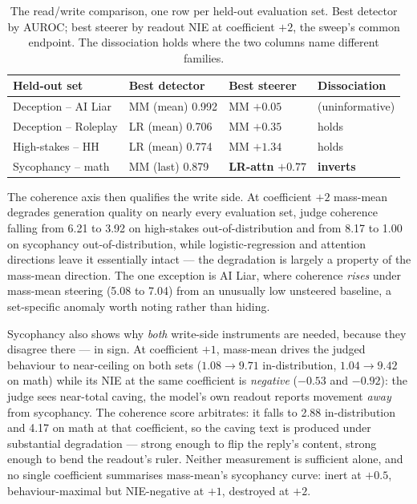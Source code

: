 \documentclass[conference]{IEEEtran}
\begin{document}
\begin{table}[t]
\caption{The read/write comparison, one row per held-out evaluation set. Best
detector by AUROC; best steerer by readout NIE at coefficient $+2$, the sweep's
common endpoint. The dissociation holds where the two columns name different
families.}
\label{tab:synth}
\centering
\footnotesize
\setlength{\tabcolsep}{2pt}
\begin{tabular}{llll}
\toprule
\textbf{Held-out set} & \textbf{Best detector} & \textbf{Best steerer} & \textbf{Dissociation} \\
\midrule
Deception -- AI Liar & MM (mean) 0.992 & MM $+0.05$ & (uninformative) \\
Deception -- Roleplay & LR (mean) 0.706 & MM $+0.35$ & holds \\
High-stakes -- HH & LR (mean) 0.774 & MM $+1.34$ & holds \\
Sycophancy -- math & MM (last) 0.879 & \textbf{LR-attn} $+0.77$ & \textbf{inverts} \\
\bottomrule
\end{tabular}
\end{table}

The coherence axis then qualifies the write side. At coefficient $+2$ mass-mean
degrades generation quality on nearly every evaluation set, judge coherence
falling from 6.21 to 3.92 on high-stakes out-of-distribution and from 8.17 to
1.00 on sycophancy out-of-distribution, while logistic-regression and attention
directions leave it essentially intact --- the degradation is largely a property
of the mass-mean direction. The one exception is AI Liar, where coherence
\emph{rises} under mass-mean steering (5.08 to 7.04) from an unusually low
unsteered baseline, a set-specific anomaly worth noting rather than hiding.

Sycophancy also shows why \emph{both} write-side instruments are needed, because
they disagree there --- in sign. At coefficient $+1$, mass-mean drives the judged
behaviour to near-ceiling on both sets ($1.08 \to 9.71$ in-distribution, $1.04 \to
9.42$ on math) while its NIE at the same coefficient is \emph{negative} ($-0.53$
and $-0.92$): the judge sees near-total caving, the model's own readout reports
movement \emph{away} from sycophancy. The coherence score arbitrates: it falls to
2.88 in-distribution and 4.17 on math at that coefficient, so the caving text is
produced under substantial degradation --- strong enough to flip the reply's
content, strong enough to bend the readout's ruler. Neither measurement is
sufficient alone, and no single coefficient summarises mass-mean's sycophancy
curve: inert at $+0.5$, behaviour-maximal but NIE-negative at $+1$, destroyed
at $+2$.
\end{document}
